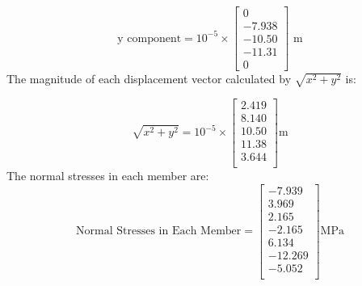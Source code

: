 \documentclass[8pt]{article}
\begin{document}
\[
\text{y component} = 10^{-5} \times
\begin{bmatrix}
    0 \\
    -7.938 \\
    -10.50 \\
    -11.31 \\
    0
\end{bmatrix} \text{ m}
\]
The magnitude of each displacement vector calculated by $\sqrt{x^2+y^2}$ is:


\[
    \sqrt{x^2+y^2} = 10^{-5} \times 
    \begin{bmatrix}
        2.419 \\
        8.140 \\
        10.50 \\
        11.38 \\
        3.644 \\
    \end{bmatrix}
    \text{m}
\]
The normal stresses in each member are:
\[
    \text{Normal Stresses in Each Member} =
    \begin{bmatrix}
        -7.939 \\
        3.969 \\
        2.165 \\
        -2.165 \\
        6.134 \\
        -12.269 \\
        -5.052 \\
    \end{bmatrix}
    \text{MPa}
\]
\end{document}
